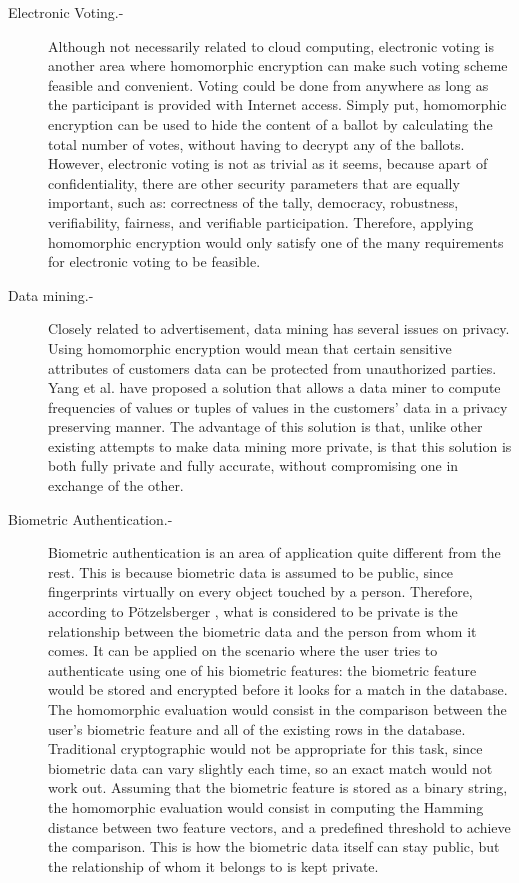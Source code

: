 \begin{description}
\item[Electronic Voting.-] Although not necessarily related to cloud computing, electronic voting is another area where homomorphic encryption can make such voting scheme feasible and convenient. Voting could be done from anywhere as long as the participant is provided with Internet access. Simply put, homomorphic encryption can be used to hide the content of a ballot by calculating the total number of votes, without having to decrypt any of the ballots. However, electronic voting is not as trivial as it seems, because apart of confidentiality, there are other security parameters that are equally important, such as: correctness of the tally, democracy, robustness, verifiability, fairness, and verifiable participation. Therefore, applying homomorphic encryption would only satisfy one of the many requirements for electronic voting to be feasible.
\item[Data mining.-] Closely related to advertisement, data mining has several issues on privacy. Using homomorphic encryption would mean that certain sensitive attributes of customers data can be protected from unauthorized parties. Yang et al. \cite{YangZhongWright} have proposed a solution that allows a data miner to compute frequencies of values or tuples of values in the customers' data in a privacy preserving manner. The advantage of this solution is that, unlike other existing attempts to make data mining more private, is that this solution is both fully private and fully accurate, without compromising one in exchange of the other.
\item[Biometric Authentication.-] Biometric authentication is an area of application quite different from the rest. This is because biometric data is assumed to be public, since fingerprints virtually on every object touched by a person. Therefore, according to P{\"o}tzelsberger \cite{potzelsberger2013kv}, what is considered to be private is the relationship between the biometric data and the person from whom it comes. It can be applied on the scenario where the user tries to authenticate using one of his biometric features: the biometric feature would be stored and encrypted before it looks for a match in the database. The homomorphic evaluation would consist in the comparison between the user's biometric feature and all of the existing rows in the database. Traditional cryptographic would not be appropriate for this task, since biometric data can vary slightly each time, so an exact match would not work out. Assuming that the biometric feature is stored as a binary string, the homomorphic evaluation would consist in computing the Hamming distance between two feature vectors, and a predefined threshold to achieve the comparison. This is how the biometric data itself can stay public, but the relationship of whom it belongs to is kept private.
\end{description}

